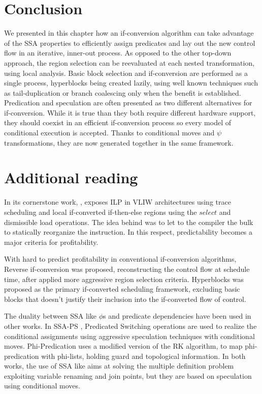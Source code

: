 \section{Conclusion} 
We presented in this chapter how an if-conversion algorithm can take advantage of the SSA properties to efficiently assign predicates and lay out the new control flow in an iterative, inner-out process. As opposed to the other top-down approach, the region selection can be reevaluated at each nested transformation, using local analysis.
Basic block selection and if-conversion are performed as a single process, hyperblocks being created lazily, using well known techniques such as tail-duplication or branch coalescing only when the benefit is established.
Predication and speculation are often presented as two different alternatives for if-conversion. While it is true than they both require different hardware support, they should coexist in an efficient if-conversion process so every model of conditional execution is accepted. Thanks to conditional moves and $\psi$ transformations, they are now generated together in the same framework.

\section{Additional reading}

In its cornerstone work, \cite{Rau:2003:IP:1074100.1074489}, exposes ILP in VLIW architectures using trace scheduling and local if-converted if-then-else regions using the $select$ and dismissible load operations. The idea behind was to let to the compiler the bulk to statically reorganize the instruction. In this respect, predictability \cite{Fisher:1992:PCB:143371.143493} becomes a major criteria for profitability.

With hard to predict profitability in conventional if-conversion algorithms, Reverse if-conversion \cite{August:1999:PRI:326224.325595} was proposed, reconstructing the control flow at schedule time, after applied more aggressive region selection criteria.
Hyperblocks \cite{Mahlke:1992:ECS:144965.144998} was proposed as the primary if-converted scheduling framework, excluding basic blocks that doesn't justify their inclusion into the if-converted flow of control.

The duality between SSA like $\phi$s and predicate dependencies have been used in other works. In SSA-PS \cite{Jacome01clusteredvliw}, Predicated Switching operations are used to realize the conditional assignments using aggressive speculation techniques with conditional moves. Phi-Predication \cite{Chuang03phi-predicationfor} uses a modified version of the RK algorithm, to map phi-predication with phi-lists, holding guard and topological information. In both works, the use of SSA like aims at solving the multiple definition problem exploiting variable renaming and join points, but they are based on speculation using conditional moves. 

